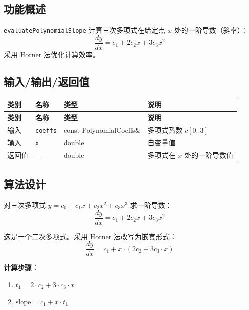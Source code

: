 \documentclass[a4paper,10pt]{article}
\begin{document}
\subsection{功能概述}

\texttt{evaluatePolynomialSlope} 计算三次多项式在给定点 $x$ 处的一阶导数（斜率）：
\[
  \frac{dy}{dx} = c_1 + 2c_2 x + 3c_3 x^2
\]
采用 Horner 法优化计算效率。

\subsection{输入/输出/返回值}

\renewcommand{\arraystretch}{1.3}
\begin{longtable}{|C{1.5cm}|L{3.5cm}|C{3cm}|L{7cm}|}
\hline
\textbf{类别} & \textbf{名称} & \textbf{类型} & \textbf{说明} \\
\hline
\endfirsthead
\hline
\textbf{类别} & \textbf{名称} & \textbf{类型} & \textbf{说明} \\
\hline
\endhead
输入 & \texttt{coeffs} & const PolynomialCoeffs\& & 多项式系数 $c[0..3]$ \\
\hline
输入 & \texttt{x} & double & 自变量值 \\
\hline
返回值 & --- & double & 多项式在 $x$ 处的一阶导数值 \\
\hline
\end{longtable}

\subsection{算法设计}

对三次多项式 $y = c_0 + c_1 x + c_2 x^2 + c_3 x^3$ 求一阶导数：
\begin{equation}
  \frac{dy}{dx} = c_1 + 2c_2 x + 3c_3 x^2
\end{equation}

这是一个二次多项式。采用 Horner 法改写为嵌套形式：
\begin{equation}
  \frac{dy}{dx} = c_1 + x \cdot (2c_2 + 3c_3 \cdot x)
\end{equation}

\textbf{计算步骤}：
\begin{enumerate}
  \item $t_1 = 2 \cdot c_2 + 3 \cdot c_3 \cdot x$
  \item $\text{slope} = c_1 + x \cdot t_1$
\end{enumerate}
\end{document}

